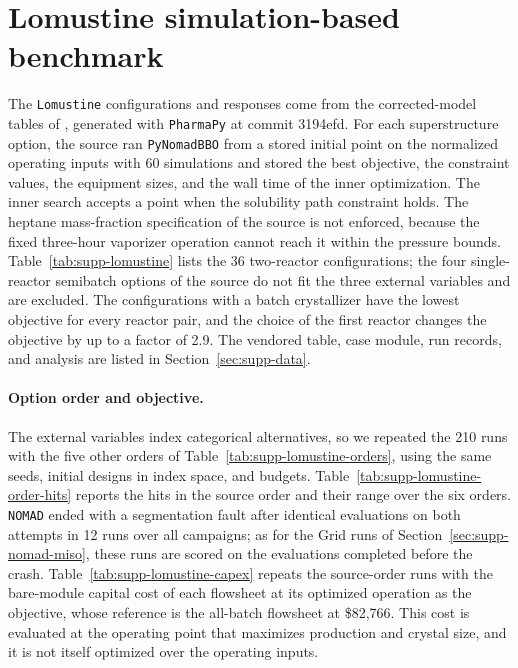 \section{Lomustine simulation-based benchmark}\label{sec:supp-lomustine}
The \texttt{Lomustine} configurations and responses come from the corrected-model tables of \citet{secquoiaPdIsing}, generated with \texttt{PharmaPy} at commit 3194efd.
For each superstructure option, the source ran \texttt{PyNomadBBO} from a stored initial point on the normalized operating inputs with 60 simulations and stored the best objective, the constraint values, the equipment sizes, and the wall time of the inner optimization.
The inner search accepts a point when the solubility path constraint holds.
The heptane mass-fraction specification of the source is not enforced, because the fixed three-hour vaporizer operation cannot reach it within the pressure bounds.
Table~\ref{tab:supp-lomustine} lists the 36 two-reactor configurations; the four single-reactor semibatch options of the source do not fit the three external variables and are excluded.
The configurations with a batch crystallizer have the lowest objective for every reactor pair, and the choice of the first reactor changes the objective by up to a factor of 2.9.
The vendored table, case module, run records, and analysis are listed in Section~\ref{sec:supp-data}.

\paragraph{Option order and objective.}
The external variables index categorical alternatives, so we repeated the 210 runs with the five other orders of Table~\ref{tab:supp-lomustine-orders}, using the same seeds, initial designs in index space, and budgets.
Table~\ref{tab:supp-lomustine-order-hits} reports the hits in the source order and their range over the six orders.
\texttt{NOMAD} ended with a segmentation fault after identical evaluations on both attempts in 12 runs over all campaigns; as for the Grid runs of Section~\ref{sec:supp-nomad-miso}, these runs are scored on the evaluations completed before the crash.
Table~\ref{tab:supp-lomustine-capex} repeats the source-order runs with the bare-module capital cost of each flowsheet at its optimized operation as the objective, whose reference is the all-batch flowsheet at \$82{,}766.
This cost is evaluated at the operating point that maximizes production and crystal size, and it is not itself optimized over the operating inputs.

